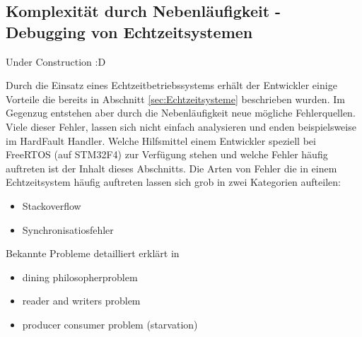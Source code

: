 \subsection{Komplexität durch Nebenläufigkeit - Debugging von Echtzeitsystemen}
\label{sec:Debugging von Echtzeitsystemen}
Under Construction :D

Durch die Einsatz eines Echtzeitbetriebssystems erhält der Entwickler einige Vorteile die bereits in Abschnitt \ref{sec:Echtzeitsysteme} beschrieben wurden. Im Gegenzug entstehen aber durch die Nebenläufigkeit neue mögliche Fehlerquellen. Viele dieser Fehler, lassen sich nicht einfach analysieren und enden beispielsweise im HardFault Handler. Welche Hilfsmittel einem Entwickler speziell bei FreeRTOS (auf STM32F4) zur Verfügung stehen und welche Fehler häufig auftreten ist der Inhalt dieses Abschnitts. Die Arten von Fehler die in einem Echtzeitsystem häufig auftreten lassen sich grob in zwei Kategorien aufteilen:
\begin{itemize}
	\item Stackoverflow
	\item Synchronisatiosfehler
\end{itemize}
Bekannte Probleme detailliert erklärt in \cite{9783827373427}
\begin{itemize}
	\item dining philosopherproblem
	\item reader and writers problem
	\item producer consumer problem (starvation)
\end{itemize}
     

